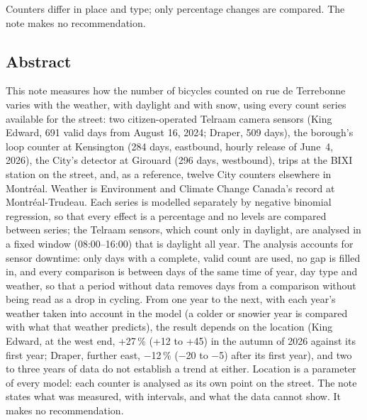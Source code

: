\documentclass[11pt,a4paper]{article}
\begin{document}
Counters differ in place and type; only percentage changes are compared. The note makes no recommendation.
\subsection*{Abstract}
This note measures how the number of bicycles counted on rue de Terrebonne varies with the weather, with daylight and with snow, using every count series available for the street: two citizen-operated Telraam camera sensors (King Edward, 691 valid days from August 16, 2024; Draper, 509 days), the borough\textquoteright{}s loop counter at Kensington (284 days, eastbound, hourly release of June~4, 2026), the City\textquoteright{}s detector at Girouard (296 days, westbound), trips at the BIXI station on the street, and, as a reference, twelve City counters elsewhere in Montréal. Weather is Environment and Climate Change Canada\textquoteright{}s record at Montréal-Trudeau. Each series is modelled separately by negative binomial regression, so that every effect is a percentage and no levels are compared between series; the Telraam sensors, which count only in daylight, are analysed in a fixed window (08:00--16:00) that is daylight all year. The analysis accounts for sensor downtime: only days with a complete, valid count are used, no gap is filled in, and every comparison is between days of the same time of year, day type and weather, so that a period without data removes days from a comparison without being read as a drop in cycling. From one year to the next, with each year\textquoteright{}s weather taken into account in the model (a colder or snowier year is compared with what that weather predicts), the result depends on the location (King Edward, at the west end, +27\,\% (+12 to +45) in the autumn of 2026 against its first year; Draper, further east, $-$12\,\% ($-$20 to $-$5) after its first year), and two to three years of data do not establish a trend at either. Location is a parameter of every model: each counter is analysed as its own point on the street. The note states what was measured, with intervals, and what the data cannot show. It makes no recommendation.
\end{document}
